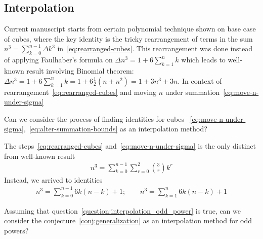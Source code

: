 ﻿\subsection{Interpolation}\label{subsec:interpolation}
Current manuscript starts from certain polynomial technique shown on base case of cubes, where the key
identity is the tricky rearrangement of terms
in the sum $n^3=\sum_{k=0}^{n-1} \Delta k^3$ in~\eqref{eq:rearranged-cubes}.
This rearrangement was done instead of applying Faulhaber's formula on $\Delta n^3 = 1 + 6\sum_{k=1}^{n} k$ which
leads to well-known result involving Binomial theorem:
$\Delta n^3 = 1 + 6\sum_{k=1}^{n} k = 1 + 6 \frac{1}{2}(n+n^2) = 1 + 3n^3 + 3n$.
In context of rearrangement~\eqref{eq:rearranged-cubes} and moving $n$ under summation~\eqref{eq:move-n-under-sigma}
\begin{question}
    \label{question:interpolation_odd_power}
    Can we consider the process of finding identities for cubes
    ~\eqref{eq:move-n-under-sigma},~\eqref{eq:alter-summation-bounds} as an interpolation method?
\end{question}

The steps~\eqref{eq:rearranged-cubes} and~\eqref{eq:move-n-under-sigma} is the only distinct from well-known
result
\begin{align*}
    n^3 = \sum_{k=0}^{n-1} \sum_{r=0}^{2} \binom{3}{r} k^r
\end{align*}
Instead, we arrived to identities
\begin{align*}
    n^3 = \sum_{k=0}^{n-1} 6k(n-k) + 1; \quad \quad n^3 = \sum_{k=1}^{n} 6k(n-k) + 1
\end{align*}
\begin{question}
    \label{question:interpolation_generalization}
    Assuming that question~\eqref{question:interpolation_odd_power} is true,
    can we consider the conjecture~\eqref{conj:generalization} as an interpolation method for odd powers?
\end{question}
